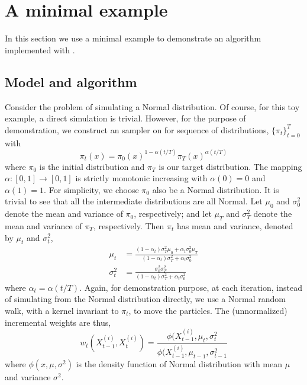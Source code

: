 \section{A minimal example}
\label{sec:A minimal example}

In this section we use a minimal example to demonstrate an \smc algorithm
implemented with \vsmc.

\subsection{Model and algorithm}
\label{sub:Model and algorithm}

Consider the problem of simulating a Normal distribution. Of course, for this
toy example, a direct simulation is trivial. However, for the purpose of
demonstration, we construct an \smc sampler on for sequence of distributions,
$\{\pi_t\}_{t=0}^T$ with
\begin{equation}
  \pi_t(x) = \pi_0(x)^{1 - \alpha(t/T)}\pi_T(x)^{\alpha(t/T)}
\end{equation}
where $\pi_0$ is the initial distribution and $\pi_T$ is our target
distribution. The mapping $\alpha:[0,1]\to[0,1]$ is strictly monotonic
increasing with $\alpha(0) = 0$ and $\alpha(1) = 1$. For simplicity, we choose
$\pi_0$ also be a Normal distribution. It is trivial to see that all the
intermediate distributions are all Normal. Let $\mu_0$ and $\sigma_0^2$ denote
the mean and variance of $\pi_0$, respectively; and let $\mu_T$ and
$\sigma_T^2$ denote the mean and variance of $\pi_T$, respectively. Then
$\pi_t$ has mean and variance, denoted by $\mu_t$ and $\sigma_t^2$,
\begin{align}
  \mu_t &= \frac{(1 - \alpha_t)\sigma_T^2\mu_0 + \alpha_t\sigma_0^2\mu_T}
  {(1 - \alpha_t)\sigma_T^2 + \alpha_t\sigma_0^2} \label{eq:mini mu_t}\\
  \sigma_t^2 &= \frac{\sigma_0^2\sigma_T^2}
  {(1 - \alpha_t)\sigma_T^2 + \alpha_t\sigma_0^2} \label{eq:mini var_t}
\end{align}
where $\alpha_t = \alpha(t/T)$. Again, for demonstration purpose, at each
iteration, instead of simulating from the Normal distribution directly, we use
a Normal random walk, with a kernel invariant to $\pi_t$, to move the
particles. The (unnormalized) incremental weights are thus,
\begin{equation}
  w_t(X_{t-1}^{(i)}, X_t^{(i)}) =
  \frac{\phi(X_{t-1}^{(i)},\mu_t,\sigma_t^2}
  {\phi(X_{t-1}^{(i)},\mu_{t-1},\sigma_{t-1}^2}
\end{equation}
where $\phi(x,\mu,\sigma^2)$ is the density function of Normal distribution
with mean $\mu$ and variance $\sigma^2$.

